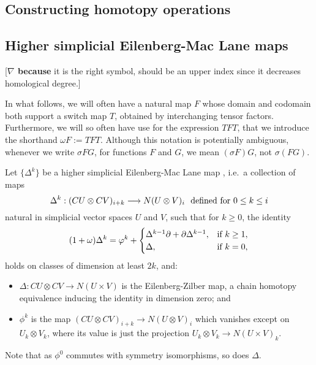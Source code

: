 \documentclass[11pt]{amsart}
\theoremstyle{plain}
\theoremstyle{definition}
\let\oldphi\phi
\let\phi\varphi
\renewcommand{\to}{\longrightarrow}
\theoremstyle{plain}
\newcommand{\twist}{\omega}
\newcommand{\DeltaUp}{\Delta}%
\newcommand{\Nabla}{\nabla}
\begin{document}
\begin{Constructing (co)homotopy operations}



\section{\textbf{Constructing homotopy operations}}\label{sec:Constructing homotopy operations}

\subsection{Higher simplicial Eilenberg-Mac Lane maps}[\textbf{$\Nabla$ because} it is the right symbol, should be an upper index since it decreases homological degree.]


In what follows, we will often have a natural map $F$ whose domain and codomain both support a switch map $T$, obtained by interchanging tensor factors. Furthermore, we will so often have use for the expression $TFT$, that we introduce the shorthand $\twist F:=TFT$. %
Although this notation is potentially ambiguous, whenever we write $\sigma FG$, for functions $F$ and $G$, we mean $(\sigma F)G$, not $\sigma(FG)$.

Let $\{\DeltaUp^k\}$ be a higher simplicial Eilenberg-Mac Lane map \cite[\S3]{DwyerHtpyOpsSimpComAlg.pdf}, i.e.\ a collection of maps
\[\DeltaUp^k:(CU\otimes CV)_{i+k}\to N(U\otimes V)_i\textup{\ \ defined for $0\leq k\leq i$}\]
natural in simplicial vector spaces $U$ and $V$, such that for $k\geq0$, the identity
\[(1+\twist) \DeltaUp^k=\oldphi^k+\begin{cases}
\DeltaUp^{k-1}\partial+\partial\DeltaUp^{k-1},&\textup{if }k\geq1,\\
\DeltaUp,&\textup{if }k=0,
\end{cases}
\]
holds on classes of dimension at least $2k$, and:
\begin{itemize}
\setlength{\parindent}{.25in}
\item $\DeltaUp:CU\otimes CV\to N(U\times V)$ is the Eilenberg-Zilber map, a chain homotopy equivalence inducing the identity in dimension zero; and
\item $\oldphi^k$ is the map $(CU\otimes CV)_{i+k}\to N(U\otimes V)_i$ which vanishes except on $U_k\otimes V_k$, where its value is just the projection $U_k\otimes V_k\to N(U\times V)_k$.
\end{itemize}
Note that as $\oldphi^0$ commutes with symmetry isomorphisms, so does $\DeltaUp$.






\end{Constructing (co)homotopy operations}
\end{document}
